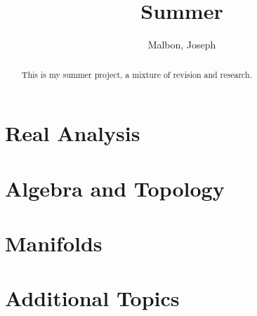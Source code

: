 \documentclass{article}
\title{Summer}
\author{Malbon, Joseph}
\theoremstyle{BreakBold}
\theoremstyle{example}
\theoremstyle{definition}
\begin{document}
\begin{titlingpage}
\maketitle
\begin{abstract}
This is my summer project, a mixture of revision and research.
\end{abstract}
\tableofcontents
\end{titlingpage}

\newpage
\section{Real Analysis}\label{sec:1}


\newpage
\section{Algebra and Topology}\label{sec:2}


\newpage
\section{Manifolds}\label{sec:3}


\newpage
\section{Additional Topics}\label{sec:4}

\end{document}
